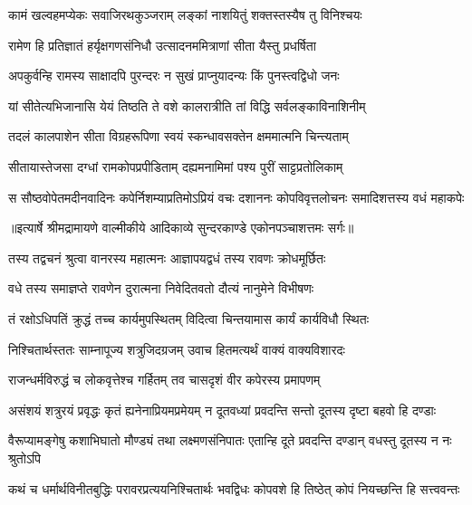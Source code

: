 \twolineshloka
{कामं खल्वहमप्येकः सवाजिरथकुञ्जराम्}
{लङ्कां नाशयितुं शक्तस्तस्यैष तु विनिश्चयः} %

\twolineshloka
{रामेण हि प्रतिज्ञातं हर्यृक्षगणसंनिधौ}
{उत्सादनममित्राणां सीता यैस्तु प्रधर्षिता} %

\twolineshloka
{अपकुर्वन्हि रामस्य साक्षादपि पुरन्दरः}
{न सुखं प्राप्नुयादन्यः किं पुनस्त्वद्विधो जनः} %

\twolineshloka
{यां सीतेत्यभिजानासि येयं तिष्ठति ते वशे}
{कालरात्रीति तां विद्धि सर्वलङ्काविनाशिनीम्} %

\twolineshloka
{तदलं कालपाशेन सीता विग्रहरूपिणा}
{स्वयं स्कन्धावसक्तेन क्षममात्मनि चिन्त्यताम्} %

\twolineshloka
{सीतायास्तेजसा दग्धां रामकोपप्रपीडिताम्}
{दह्यमनामिमां पश्य पुरीं साट्टप्रतोलिकाम्} %

\fourlineindentedshloka
{स सौष्ठवोपेतमदीनवादिनः}
{कपेर्निशम्याप्रतिमोऽप्रियं वचः}
{दशाननः कोपविवृत्तलोचनः}
{समादिशत्तस्य वधं महाकपेः} %


{॥इत्यार्षे श्रीमद्रामायणे वाल्मीकीये आदिकाव्ये सुन्दरकाण्डे एकोनपञ्चाशत्तमः सर्गः॥}


\twolineshloka
{तस्य तद्वचनं श्रुत्वा वानरस्य महात्मनः}
{आज्ञापयद्वधं तस्य रावणः क्रोधमूर्छितः} %

\twolineshloka
{वधे तस्य समाज्ञप्ते रावणेन दुरात्मना}
{निवेदितवतो दौत्यं नानुमेने विभीषणः} %

\twolineshloka
{तं रक्षोऽधिपतिं क्रुद्धं तच्च कार्यमुपस्थितम्}
{विदित्वा चिन्तयामास कार्यं कार्यविधौ स्थितः} %

\twolineshloka
{निश्चितार्थस्ततः साम्नापूज्य शत्रुजिदग्रजम्}
{उवाच हितमत्यर्थं वाक्यं वाक्यविशारदः} %

\twolineshloka
{राजन्धर्मविरुद्धं च लोकवृत्तेश्च गर्हितम्}
{तव चासदृशं वीर कपेरस्य प्रमापणम्} %

\fourlineindentedshloka
{असंशयं शत्रुरयं प्रवृद्धः}
{कृतं ह्यनेनाप्रियमप्रमेयम्}
{न दूतवध्यां प्रवदन्ति सन्तो}
{दूतस्य दृष्टा बहवो हि दण्डाः} %

\fourlineindentedshloka
{वैरूप्यामङ्गेषु कशाभिघातो}
{मौण्ड्यं तथा लक्ष्मणसंनिपातः}
{एतान्हि दूते प्रवदन्ति दण्डान्}
{वधस्तु दूतस्य न नः श्रुतोऽपि} %

\fourlineindentedshloka
{कथं च धर्मार्थविनीतबुद्धिः}
{परावरप्रत्ययनिश्चितार्थः}
{भवद्विधः कोपवशे हि तिष्ठेत्}
{कोपं नियच्छन्ति हि सत्त्ववन्तः} %

